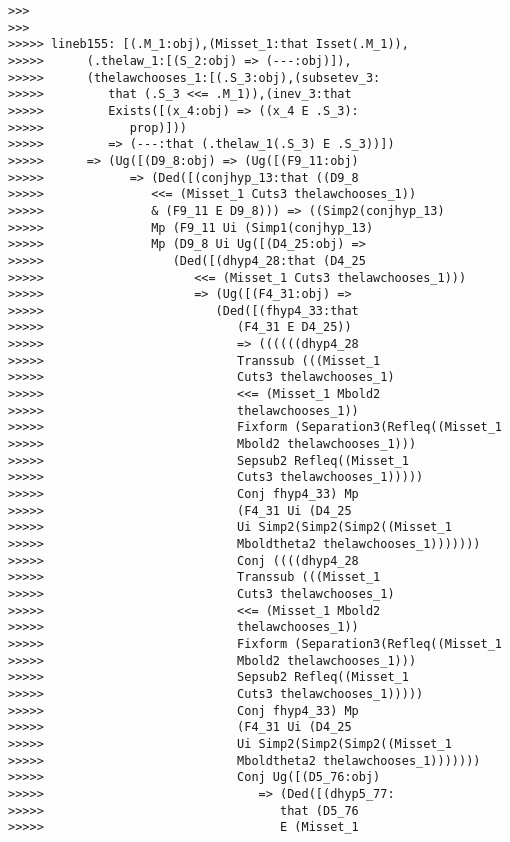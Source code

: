 \documentclass[12pt]{article}
\begin{document}
\begin{verbatim}
>>>
>>>
>>>>> lineb155: [(.M_1:obj),(Misset_1:that Isset(.M_1)),
>>>>>      (.thelaw_1:[(S_2:obj) => (---:obj)]),
>>>>>      (thelawchooses_1:[(.S_3:obj),(subsetev_3:
>>>>>         that (.S_3 <<= .M_1)),(inev_3:that
>>>>>         Exists([(x_4:obj) => ((x_4 E .S_3):
>>>>>            prop)]))
>>>>>         => (---:that (.thelaw_1(.S_3) E .S_3))])
>>>>>      => (Ug([(D9_8:obj) => (Ug([(F9_11:obj)
>>>>>            => (Ded([(conjhyp_13:that ((D9_8
>>>>>               <<= (Misset_1 Cuts3 thelawchooses_1))
>>>>>               & (F9_11 E D9_8))) => ((Simp2(conjhyp_13)
>>>>>               Mp (F9_11 Ui (Simp1(conjhyp_13)
>>>>>               Mp (D9_8 Ui Ug([(D4_25:obj) =>
>>>>>                  (Ded([(dhyp4_28:that (D4_25
>>>>>                     <<= (Misset_1 Cuts3 thelawchooses_1)))
>>>>>                     => (Ug([(F4_31:obj) =>
>>>>>                        (Ded([(fhyp4_33:that
>>>>>                           (F4_31 E D4_25))
>>>>>                           => ((((((dhyp4_28
>>>>>                           Transsub (((Misset_1
>>>>>                           Cuts3 thelawchooses_1)
>>>>>                           <<= (Misset_1 Mbold2
>>>>>                           thelawchooses_1))
>>>>>                           Fixform (Separation3(Refleq((Misset_1
>>>>>                           Mbold2 thelawchooses_1)))
>>>>>                           Sepsub2 Refleq((Misset_1
>>>>>                           Cuts3 thelawchooses_1)))))
>>>>>                           Conj fhyp4_33) Mp
>>>>>                           (F4_31 Ui (D4_25
>>>>>                           Ui Simp2(Simp2(Simp2((Misset_1
>>>>>                           Mboldtheta2 thelawchooses_1)))))))
>>>>>                           Conj ((((dhyp4_28
>>>>>                           Transsub (((Misset_1
>>>>>                           Cuts3 thelawchooses_1)
>>>>>                           <<= (Misset_1 Mbold2
>>>>>                           thelawchooses_1))
>>>>>                           Fixform (Separation3(Refleq((Misset_1
>>>>>                           Mbold2 thelawchooses_1)))
>>>>>                           Sepsub2 Refleq((Misset_1
>>>>>                           Cuts3 thelawchooses_1)))))
>>>>>                           Conj fhyp4_33) Mp
>>>>>                           (F4_31 Ui (D4_25
>>>>>                           Ui Simp2(Simp2(Simp2((Misset_1
>>>>>                           Mboldtheta2 thelawchooses_1)))))))
>>>>>                           Conj Ug([(D5_76:obj)
>>>>>                              => (Ded([(dhyp5_77:
>>>>>                                 that (D5_76
>>>>>                                 E (Misset_1

\end{verbatim}
\end{document}
